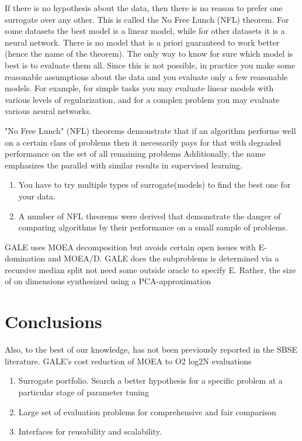         If there is no hypothesis about the data, then there is no reason to prefer one surrogate over any other. This is called the No Free Lunch (NFL) theorem. For some datasets the best
        model is a linear model, while for other datasets it is a neural network. There is no model that is a priori guaranteed to work better (hence the name of the theorem). 
        The only way to know for sure which model is best is to evaluate them all. Since this is not possible, in practice you make some reasonable assumptions about the data 
        and you evaluate only a few reasonable models. For example, for simple tasks you may evaluate linear models with various levels of regularization, 
        and for a complex problem you may evaluate various neural networks.

        "No Free Lunch" (NFL) theorems demonstrate that if an algorithm performs well on a certain class of problems then it necessarily pays for that with degraded performance on the set of 
        all remaining problems Additionally, the name emphasizes the parallel with similar results in supervised learning.
        \begin{enumerate}
            \item You have to try multiple types of surrogate(models) to find the best one for your data.
            \item A number of NFL theorems were derived that demonstrate the danger of comparing algorithms by their performance on a small sample of problems.
        \end{enumerate}

        GALE uses MOEA decomposition but avoids certain open issues with E-domination and MOEA/D. 
        GALE does the subproblems is determined via a recursive median split not need some outside oracle to specify E. 
        Rather, the size of on dimensions synthesized using a PCA-approximation


    \section{Conclusions}

        Also, to the best of our knowledge, has not been previously reported in the SBSE literature. GALE’s cost reduction of MOEA to O2 log2N evaluations
        
        \begin{enumerate}
            \item Surrogate portfolio. Search a better hypothesis for a specific problem at a particular stage of parameter tuning
            \item Large set of evaluation problems for comprehensive and fair comparison
            \item Interfaces for reusability and scalability. 
        \end{enumerate}


